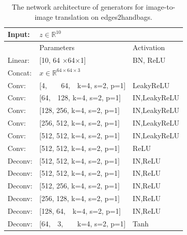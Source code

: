 \documentclass[runningheads]{llncs}
\begin{document}
\begin{table}
	\vspace{-20pt}
	\centering
	\caption{The network architecture of generators for image-to-image translation on edges2handbags.}
	\vspace{3pt}
	\begin{tabular}{lll}
		\toprule[2pt]
		Input: & $z \in \mathbb{R}^{10}$ & \\
		\hline
		& Parameters & Activation \\
		\hline
		Linear: & [10, 64 $\times$64$\times$1] & BN, ReLU \\
		\hline
		Concat: & $x \in \mathbb{R}^{64\times64\times3}$ \\
		\hline 
		Conv: & [4,~~~~64,~~k=4, s=2, p=1] & LeakyReLU \\
		\hline
		Conv: & [64,~~128, k=4, s=2, p=1] & IN,LeakyReLU \\
		\hline
		Conv: & [128, 256, k=4, s=2, p=1] & IN,LeakyReLU \\
		\hline 
		Conv: & [256, 512, k=4, s=2, p=1] & IN,LeakyReLU \\
		\hline 
		Conv: & [512, 512, k=4, s=2, p=1] & IN,LeakyReLU \\
		\hline 
		Conv: & [512, 512, k=4, s=2, p=1] & ReLU \\
		\hline 
		Deconv: & [512, 512, k=4, s=2, p=1] & IN,ReLU \\
		\hline
		Deconv: & [512, 512, k=4, s=2, p=1] & IN,ReLU \\
		\hline
		Deconv: & [512, 256, k=4, s=2, p=1] & IN,ReLU \\
		\hline 
		Deconv: & [256, 128, k=4, s=2, p=1] & IN,ReLU \\
		\hline 
		Deconv: & [128, 64,~~k=4, s=2, p=1] & IN,ReLU \\
		\hline 
		Deconv: & [64,~~3,~~~~k=4, s=2, p=1] & Tanh \\
		\bottomrule[2pt]
	\end{tabular}
	\label{image2image_translation_generator_ae64}
\end{table}
\end{document}
